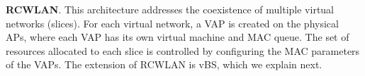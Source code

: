 


\textbf{RCWLAN}. This architecture \cite{nakauchi2012airtime} addresses the coexistence of multiple virtual networks (slices).
For each virtual network, a VAP is created on the physical APs, where each VAP has its own virtual machine and MAC queue.
The set of resources allocated to each slice is controlled by configuring the MAC parameters of the VAPs.
The extension of RCWLAN is vBS, which we explain next.


